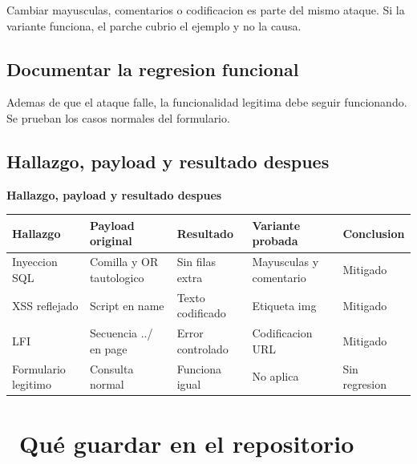 \documentclass[11pt,a4paper]{article}
\newcommand{\iconotexto}[2]{\textcolor{cyanNeon}{\faIcon{#1}}~#2}
\begin{document}
Cambiar mayusculas, comentarios o codificacion es parte del mismo ataque. Si la variante funciona, el parche cubrio el ejemplo y no la causa.

\subsection{Documentar la regresion funcional}

Ademas de que el ataque falle, la funcionalidad legitima debe seguir funcionando. Se prueban los casos normales del formulario.

\subsection{Hallazgo, payload y resultado despues}

\begin{center}
\begin{minipage}{\linewidth}
\centering
{\footnotesize
\textbf{Hallazgo, payload y resultado despues}\par\smallskip
\begin{tabular}{@{}>{\raggedright\arraybackslash}p{2.20cm}>{\raggedright\arraybackslash}p{3.60cm}>{\raggedright\arraybackslash}p{2.40cm}>{\raggedright\arraybackslash}p{3.20cm}>{\raggedright\arraybackslash}p{2.60cm}@{}}
\toprule
\textbf{Hallazgo} & \textbf{Payload original} & \textbf{Resultado} & \textbf{Variante probada} & \textbf{Conclusion} \\
\midrule
Inyeccion SQL & Comilla y OR tautologico & Sin filas extra & Mayusculas y comentario & Mitigado \\
XSS reflejado & Script en name & Texto codificado & Etiqueta img & Mitigado \\
LFI & Secuencia ../ en page & Error controlado & Codificacion URL & Mitigado \\
Formulario legitimo & Consulta normal & Funciona igual & No aplica & Sin regresion \\
\bottomrule
\end{tabular}
}
\par{}
\end{minipage}
\end{center}

\section{\iconotexto{box-open}{Qué guardar en el repositorio}}
\end{document}
